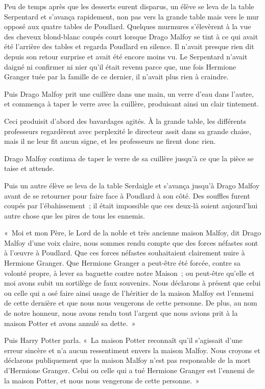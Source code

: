 Peu de temps après que les desserts eurent disparus, un élève se leva de la table Serpentard et s'avança rapidement, non pas vers la grande table mais vers le mur opposé aux quatre tables de Poudlard. Quelques murmures s'élevèrent à la vue des cheveux blond-blanc coupés court lorsque Drago Malfoy se tint à ce qui avait été l'arrière des tables et regarda Poudlard en silence. Il n'avait presque rien dit depuis son retour surprise et avait été encore moins vu. Le Serpentard n'avait daigné ni confirmer ni nier qu'il était revenu parce que, une fois Hermione Granger tuée par la famille de ce dernier, il n'avait plus rien à craindre.

Puis Drago Malfoy prit une cuillère dans une main, un verre d'eau dans l'autre, et commença à taper le verre avec la cuillère, produisant ainsi un clair tintement.

Ceci produisit d'abord des bavardages agités. À la grande table, les différents professeurs regardèrent avec perplexité le directeur assit dans sa grande chaise, mais il ne leur fit aucun signe, et les professeurs ne firent donc rien.

Drago Malfoy continua de taper le verre de sa cuillère jusqu'à ce que la pièce se taise et attende.

Puis un autre élève se leva de la table Serdaigle et s'avança jusqu'à Drago Malfoy avant de se retourner pour faire face à Poudlard à son côté. Des souffles furent coupés par l'ébahissement~; il était impossible que ces deux-là soient aujourd'hui autre chose que les pires de tous les ennemis.

«~Moi et mon Père, le Lord de la noble et très ancienne maison Malfoy, dit Drago Malfoy d'une voix claire, nous sommes rendu compte que des forces néfastes sont à l'œuvre à Poudlard. Que ces forces néfastes souhaitaient clairement nuire à Hermione Granger. Que Hermione Granger a peut-être été forcée, contre sa volonté propre, à lever sa baguette contre notre Maison~; ou peut-être qu'elle et moi avons subit un sortilège de faux souvenirs. Nous déclarons à présent que celui ou celle qui a osé faire ainsi usage de l'héritier de la maison Malfoy est l'ennemi de cette dernière et que nous nous vengerons de cette personne. De plus, au nom de notre honneur, nous avons rendu tout l'argent que nous avions prit à la maison Potter et avons annulé sa dette.~»

Puis Harry Potter parla. «~La maison Potter reconnaît qu'il s'agissait d'une erreur sincère et n'a aucun ressentiment envers la maison Malfoy. Nous croyons et déclarons publiquement que la maison Malfoy n'est pas responsable de la mort d'Hermione Granger. Celui ou celle qui a tué Hermione Granger est l'ennemi de la maison Potter, et nous nous vengerons de cette personne.~»

